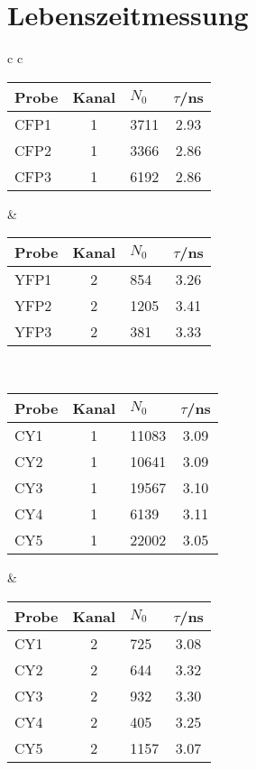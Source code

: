 \section{Lebenszeitmessung}
\label{sec:lebenszeit}

\begin{center}
    \begin{tabular}{c c}
        \begin{tabular}{l c | l c}
            Probe & Kanal & $N_0$ & $\tau$/ns\\
            \hline
            CFP1 & 1 & 3711  & 2.93 \\
            CFP2 & 1 & 3366  & 2.86 \\
            CFP3 & 1 & 6192  & 2.86 \\
        \end{tabular}
        & \hspace{1cm}
        \begin{tabular}{l c | l c}
            Probe & Kanal & $N_0$ & $\tau$/ns\\
            \hline
            YFP1 & 2 & 854   & 3.26 \\
            YFP2 & 2 & 1205  & 3.41 \\
            YFP3 & 2 & 381   & 3.33 \\
        \end{tabular}\\[1,5cm]
        \begin{tabular}{l c | l c}
            Probe & Kanal & $N_0$ & $\tau$/ns\\
            \hline
            CY1  & 1 & 11083 & 3.09 \\
            CY2  & 1 & 10641 & 3.09 \\
            CY3  & 1 & 19567 & 3.10 \\
            CY4  & 1 & 6139  & 3.11 \\
            CY5  & 1 & 22002 & 3.05 \\
        \end{tabular}
        & \hspace{1cm}
        \begin{tabular}{l c | l c}
            Probe & Kanal & $N_0$ & $\tau$/ns\\
            \hline
            CY1  & 2 & 725   & 3.08 \\
            CY2  & 2 & 644   & 3.32 \\
            CY3  & 2 & 932   & 3.30 \\
            CY4  & 2 & 405   & 3.25 \\
            CY5  & 2 & 1157  & 3.07 \\
        \end{tabular}
    \end{tabular}
\end{center}


